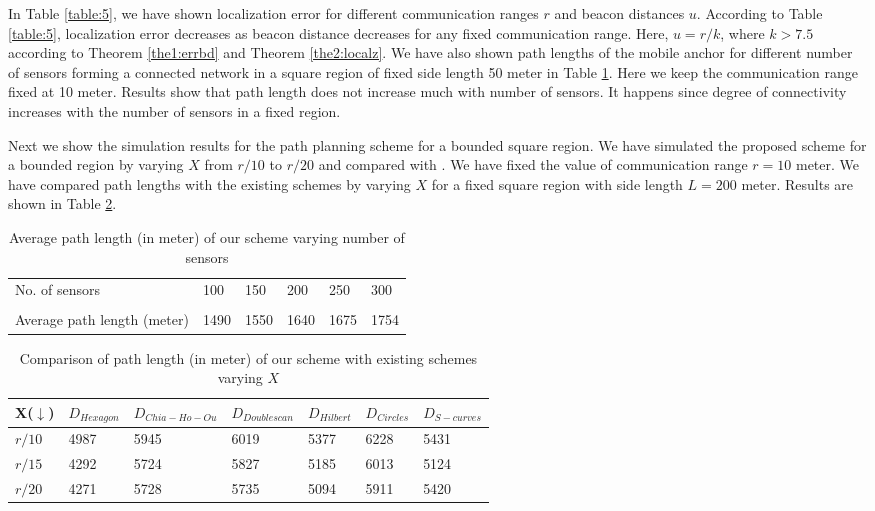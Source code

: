 \documentclass[preprint,11pt]{elsarticle}
\begin{document}
In Table \ref{table:5}, we have shown localization error for different communication ranges $r$ and beacon distances $u$.
According to Table \ref{table:5}, localization error decreases as beacon distance decreases for any fixed communication range.
Here, $u=r/k$, where $k>7.5$ according to Theorem \ref{the1:errbd} and Theorem  \ref{the2:localz}.
We have also shown path lengths of the mobile anchor for different number of sensors forming a connected network in a square region of fixed side length 50 meter in  Table \ref{table:2}. Here we keep the communication range fixed at 10 meter. Results show that path length does not increase much with number of sensors. It happens since degree of connectivity increases with the number of sensors in a fixed region.

Next we show the simulation results for the path planning scheme for a bounded square region.
We have simulated the proposed scheme for a bounded region by varying $X$ from $r/10$ to $r/20$ and compared with
\cite{Chia-Ho-Ou2013}. We have fixed the value of communication range $r=10$ meter. We have compared path lengths with the existing schemes
by varying $X$ for a fixed square region with side length $L=200$ meter. Results are shown in Table \ref{table:3}.
\begin{table}[]
\center
\caption{Average path length (in meter) of our scheme varying number of sensors}
\label{table:2}
\begin{tabular}{p{4cm}|p{1.5cm}|p{1.5cm}|p{1.5cm}|p{1.5cm}|p{1.5cm}}
\hline
\hline
   No. of sensors  & 100   & 150     & 200  & 250     & 300  \\
  &      &     &  & &      \\
\hline
 Average path length (meter) & 1490 & 1550 & 1640 & 1675 & 1754   \\
\hline
\hline
\end{tabular}
\end{table}
\begin{table}[h]
\center
\caption{Comparison of path length (in meter) of our scheme with existing schemes varying $X$}
\label{table:3}
\begin{tabular}
{p{1cm}|p{1.4cm}|p{2.2cm}|p{1.6cm} |p{1.4cm}|p{1.4cm}|p{1.4cm}}
\hline
\hline
X($\downarrow$) & $D_{Hexagon}$  & $D_{Chia-Ho-Ou}$  & $D_{Doublescan}$  & $D_{Hilbert}$  & $D_{Circles}$ & $D_{S-curves}$ \\
\hline
$r/10$ & 4987 & 5945 & 6019 & 5377 & 6228 & 5431 \\
$r/15$ & 4292 & 5724 & 5827 & 5185 & 6013 & 5124 \\
$r/20$ & 4271 & 5728 & 5735 & 5094 & 5911 & 5420 \\
\hline
\hline
\end{tabular}
\end{table}
\end{document}
